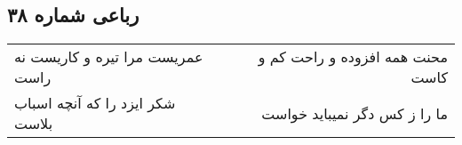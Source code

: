 \begin{center}
\section*{رباعی شماره ۳۸}
\label{sec:sh038}
\begin{longtable}{l p{0.5cm} r}
عمریست مرا تیره و کاریست نه راست
&&
محنت همه افزوده و راحت کم و کاست
\\
شکر ایزد را که آنچه اسباب بلاست
&&
ما را ز کس دگر نمیباید خواست
\\
\end{longtable}
\end{center}
